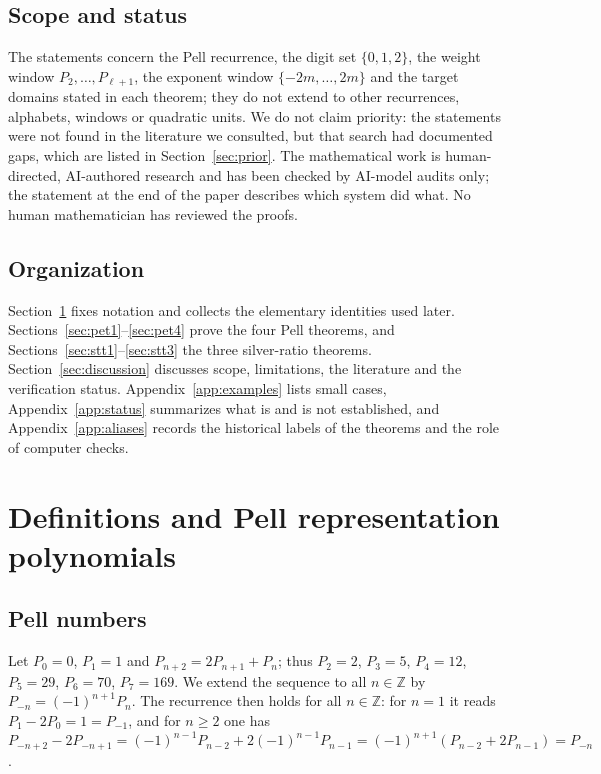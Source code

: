 \documentclass[11pt]{amsart}
\theoremstyle{definition}
\theoremstyle{remark}
\theoremstyle{plain}
\numberwithin{equation}{section}
\newcommand{\Z}{\mathbb{Z}}
\begin{document}
\subsection{Scope and status}
The statements concern the Pell recurrence, the digit set $\{0,1,2\}$, the weight window
$P_2,\dots,P_{\ell+1}$, the exponent window $\{-2m,\dots,2m\}$ and the target domains stated in each
theorem; they do not extend to other recurrences, alphabets, windows or quadratic units. We do not
claim priority: the statements were not found in the literature we consulted, but that search had
documented gaps, which are listed in Section~\ref{sec:prior}. The mathematical work is human-directed, AI-authored research
and has been checked by AI-model audits only; the statement at the
end of the paper describes which system did what. No human mathematician has reviewed the proofs.

\subsection{Organization}
Section~\ref{sec:defs} fixes notation and collects the elementary identities used later.
Sections~\ref{sec:pet1}--\ref{sec:pet4} prove the four Pell theorems, and
Sections~\ref{sec:stt1}--\ref{sec:stt3} the three silver-ratio theorems. Section~\ref{sec:discussion}
discusses scope, limitations, the literature and the verification status. Appendix~\ref{app:examples}
lists small cases, Appendix~\ref{app:status} summarizes what is and is not established, and
Appendix~\ref{app:aliases} records the historical labels of the theorems and the role of computer
checks.

\section{Definitions and Pell representation polynomials}\label{sec:defs}

\subsection{Pell numbers}
Let $P_0=0$, $P_1=1$ and $P_{n+2}=2P_{n+1}+P_n$; thus
$P_2=2$, $P_3=5$, $P_4=12$, $P_5=29$, $P_6=70$, $P_7=169$. We extend the sequence to all $n\in\Z$ by
$P_{-n}=(-1)^{n+1}P_n$. The recurrence then holds for all $n\in\Z$: for $n=1$ it reads
$P_1-2P_0=1=P_{-1}$, and for $n\ge2$ one has
$P_{-n+2}-2P_{-n+1}=(-1)^{n-1}P_{n-2}+2(-1)^{n-1}P_{n-1}=(-1)^{n+1}(P_{n-2}+2P_{n-1})=P_{-n}$.
\end{document}
